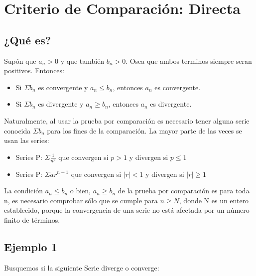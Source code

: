 \documentclass[12pt]{report}							    %
\begin{document}
    \clearpage
    \section{Criterio de Comparación: Directa}


    \subsection{¿Qué es?}
    Supón que $a _n > 0$ y que también $b_n > 0$. Osea que ambos terminos siempre seran positivos.
    Entonces:

    \begin{itemize}
        \item Si $\Sigma b_n$ es convergente y $a_n \leq b_n$, entonces $a_n$ es convergente. 
        \item Si $\Sigma b_n$ es divergente y $a_n \geq b_n$, entonces $a_n$ es divergente. 
    \end{itemize}

    Naturalmente, al usar la prueba por comparación es necesario tener alguna serie conocida $\Sigma b_n$
    para los fines de la comparación. La mayor parte de las veces se usan las series:

    \begin{itemize}
        \item Series P: $\Sigma \frac{1}{n^p}$ que convergen si $p>1$ y divergen si $p\leq 1$
        \item Series P: $\Sigma ar^{n-1}$ que convergen si $|r|<1$ y divergen si $|r|\geq 1$
    \end{itemize}

    La condición $a_n \leq b_n$ o bien, $a_n \geq b_n$ de la prueba por comparación es para toda n, es
    necesario comprobar sólo que se cumple para $n \geq N$, donde N es un entero establecido, porque
    la convergencia de una serie no está afectada por un número finito de términos.

    \subsection{Ejemplo 1}
    Busquemos si la siguiente Serie diverge o converge:
\end{document}
